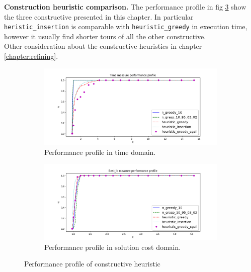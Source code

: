 \textbf{Construction heuristic comparison.} The performance profile in fig \ref{fig:pp_Lconstructives} show the three constructive presented in this chapter. In particular \texttt{heristic\_insertion} is comparable with \texttt{heuristic\_greedy} in execution time, however it usually find shorter tours of all the other constructive.\\
Other consideration about the constructive heuristics in chapter \ref{chapter:refining}.

\begin{figure}[!h]
	\centering
	\begin{subfigure}{.9\textwidth}
		\centering
		\includegraphics[width=\columnwidth]{../res/Lconstructives_LA_time.png}
		\caption{Performance profile in time domain.}
		\label{fig:Lconstructives_time}
	\end{subfigure}
	\begin{subfigure}{.9\textwidth}
	\centering
	\includegraphics[width=\columnwidth]{../res/Lconstructives_LA_lb.png}
	\caption{Performance profile in solution cost domain.}
	\label{fig:Lconstructives_lb}
	\end{subfigure}
	\caption{Performance profile of constructive heuristic}
	\label{fig:pp_Lconstructives}
\end{figure}
